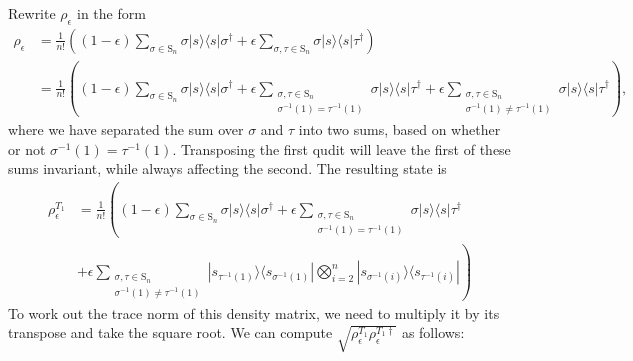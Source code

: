 Rewrite $\rho_\epsilon$ in the form
\begin{align}
\rho_\epsilon
 &= \frac{1}{n!}\left((1-\epsilon)\sum_{\sigma\in \textrm{S}_n}\sigma|s\rangle\langle s|\sigma^\dagger + \epsilon\sum_{\sigma,\tau \in \textrm{S}_n}\sigma|s\rangle\langle s|\tau^\dagger\right)\\
 &= \frac{1}{n!}\left((1-\epsilon)\sum_{\sigma\in \textrm{S}_n}\sigma|s\rangle\langle s|\sigma^\dagger + \epsilon\sum_{\substack{\sigma,\tau \in \textrm{S}_n\\\sigma^{-1}(1) = \tau^{-1}(1)}}\sigma|s\rangle\langle s|\tau^\dagger + \epsilon\sum_{\substack{\sigma,\tau \in \textrm{S}_n\\\sigma^{-1}(1) \neq \tau^{-1}(1)}}\sigma|s\rangle\langle s|\tau^\dagger\right) ,
\end{align}
where we have separated the sum over $\sigma$ and $\tau$ into two sums, based on whether or not $\sigma^{-1}(1) = \tau^{-1}(1)$. 
Transposing the first qudit will leave the first of these sums invariant, while always affecting the second. 
The resulting state is
\begin{align}
\rho_{\epsilon}^{T_1}&=
\frac{1}{n!} \left((1-\epsilon)\sum_{\sigma\in \textrm{S}_n}\sigma|s\rangle\langle s|\sigma^\dagger + \epsilon\sum_{\substack{\sigma,\tau \in \textrm{S}_n\\\sigma^{-1}(1) = \tau^{-1}(1)}}\sigma|s\rangle\langle s|\tau^\dagger\right.\nonumber\\
&\left.+ \epsilon\sum_{\substack{\sigma,\tau \in \textrm{S}_n\\\sigma^{-1}(1) \neq \tau^{-1}(1)}}|s_{\tau^{-1}(1)}\rangle\langle s_{\sigma^{-1}(1)}|\bigotimes_{i=2}^n|s_{\sigma^{-1}(i)}\rangle\langle s_{\tau^{-1}(i)}|\right)
\end{align}
To work out the trace norm of this density matrix, we need to multiply it by its transpose and take the square root. 
We can compute $\sqrt{\rho_{\epsilon}^{T_1}\rho_{\epsilon}^{T_1\dagger}}$ as follows:

